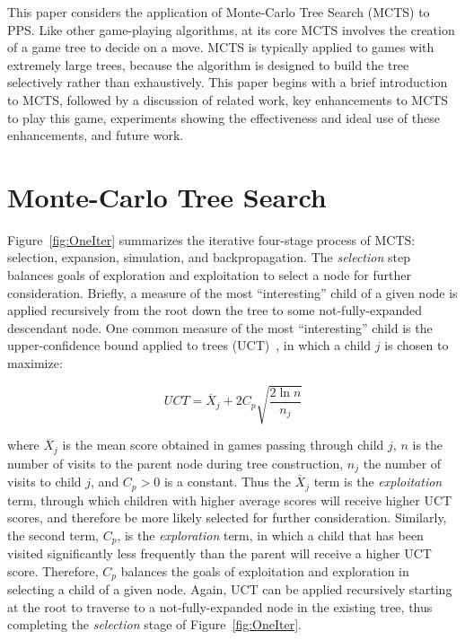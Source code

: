 \documentclass[letterpaper]{article}
\begin{document}
This paper considers the application of Monte-Carlo Tree Search (MCTS) to PPS. Like other game-playing algorithms, at its core MCTS involves the creation of a game tree to decide on a move. MCTS is typically applied to games with extremely large trees, because the algorithm is designed to build the tree selectively rather than exhaustively. This paper begins with a brief introduction to MCTS, followed by a discussion of related work, key enhancements to MCTS to play this game, experiments showing the effectiveness and ideal use of these enhancements, and future work.

\section{Monte-Carlo Tree Search}

Figure~\ref{fig:OneIter} summarizes the iterative four-stage process of MCTS: selection, expansion, simulation, and backpropagation. The {\it selection} step balances goals of exploration and exploitation to select a node for further consideration. Briefly, a measure of the most ``interesting'' child of a given node is applied recursively from the root down the tree to some not-fully-expanded descendant node. One common measure of the most ``interesting'' child is the upper-confidence bound applied to trees (UCT)~\cite{kocsis2006improved}, in which a child $j$ is chosen to maximize:

\begin{equation} \label{eq:UCT}
UCT = \overline{X}_j + 2C_p\sqrt{\frac{2\ln{n}}{n_j}}
\end{equation}

\noindent where $\overline{X}_j$ is the mean score obtained in games passing through child $j$, $n$ is the number of visits to the parent node during tree construction, $n_j$ the number of visits to child $j$, and $C_p > 0$ is a constant. Thus the $\overline{X}_j$ term is the {\it exploitation} term, through which children with higher average scores will receive higher UCT scores, and therefore be more likely selected for further consideration. Similarly, the second term, $C_p$, is the {\it exploration} term, in which a child that has been visited significantly less frequently than the parent will receive a higher UCT score. Therefore, $C_p$ balances the goals of exploitation and exploration in selecting a child of a given node. Again, UCT can be applied recursively starting at the root to traverse to a not-fully-expanded node in the existing tree, thus completing the {\it selection} stage of Figure~\ref{fig:OneIter}.
\end{document}
